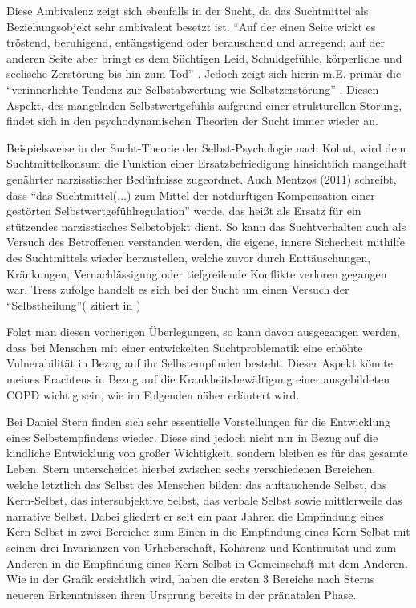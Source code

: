 Diese Ambivalenz zeigt sich ebenfalls in der Sucht, da das Suchtmittel als Beziehungsobjekt sehr ambivalent besetzt ist. "`Auf der einen Seite wirkt es tröstend, beruhigend, entängstigend oder berauschend und anregend; auf der anderen Seite aber bringt es dem Süchtigen Leid, Schuldgefühle, körperliche und seelische Zerstörung bis hin zum Tod"' \autocite[175]{mentzos2011}. Jedoch zeigt sich hierin m.E. primär die "`verinnerlichte Tendenz zur Selbstabwertung wie Selbstzerstörung"' \autocite[10]{weidlinger2012}. Diesen Aspekt, des mangelnden Selbstwertgefühls aufgrund einer strukturellen Störung, findet sich in den psychodynamischen Theorien der Sucht immer wieder an. 

Beispielsweise in der Sucht-Theorie der Selbst-Psychologie nach Kohut, wird dem Suchtmittelkonsum die Funktion einer Ersatzbefriedigung hinsichtlich mangelhaft genährter narzisstischer Bedürfnisse zugeordnet. Auch Mentzos (2011) schreibt, dass "`das Suchtmittel(...) zum Mittel der notdürftigen Kompensation einer gestörten Selbstwertgefühlregulation"' werde, das heißt als Ersatz für ein stützendes narzisstisches Selbstobjekt dient. So kann das Suchtverhalten auch als Versuch des Betroffenen verstanden werden, die eigene, innere Sicherheit mithilfe des Suchtmittels wieder herzustellen, welche zuvor durch Enttäuschungen, Kränkungen, Vernachlässigung oder tiefgreifende Konflikte verloren gegangen war. Tress zufolge handelt es sich bei der Sucht um einen Versuch der "`Selbstheilung"'(\cite{tress1985} zitiert in \cite[222]{ermann1999})

Folgt man diesen vorherigen Überlegungen, so kann davon ausgegangen werden, dass bei Menschen mit einer entwickelten Suchtproblematik eine erhöhte Vulnerabilität in Bezug auf ihr Selbstempfinden besteht. Dieser Aspekt könnte meines Erachtens in Bezug auf die Krankheitsbewältigung einer ausgebildeten COPD wichtig sein, wie im Folgenden näher erläutert wird.

Bei Daniel Stern finden sich sehr essentielle Vorstellungen für die Entwicklung eines Selbstempfindens wieder. Diese sind jedoch nicht nur in Bezug auf die kindliche Entwicklung von großer Wichtigkeit, sondern bleiben es für das gesamte Leben. Stern unterscheidet hierbei zwischen sechs verschiedenen Bereichen, welche letztlich das Selbst des Menschen bilden: das auftauchende Selbst, das Kern-Selbst, das intersubjektive Selbst, das verbale Selbst sowie mittlerweile das narrative Selbst. Dabei gliedert er seit ein paar Jahren die Empfindung eines Kern-Selbst in zwei Bereiche: zum Einen in die Empfindung eines Kern-Selbst mit seinen drei Invarianzen von Urheberschaft, Kohärenz und Kontinuität und zum Anderen in die Empfindung eines Kern-Selbst in Gemeinschaft mit dem Anderen.  Wie in der Grafik ersichtlich wird, haben die ersten 3 Bereiche nach Sterns neueren Erkenntnissen ihren Ursprung bereits in der pränatalen Phase.



